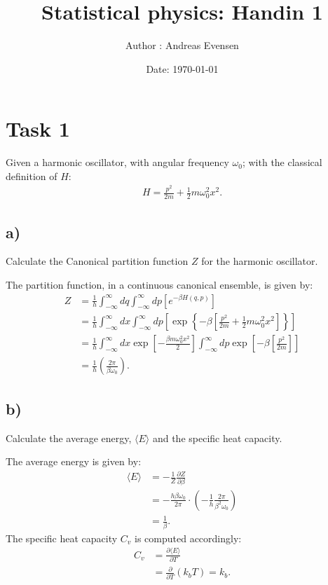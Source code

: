 \documentclass[a4paper]{article}
\title{Statistical physics: Handin 1}
\author{Author : Andreas Evensen}
\date{Date: \today}
\newcommand{\w}{\omega}
\newcommand{\average}[1]{\langle #1 \rangle}
\begin{document}
\maketitle

\section*{Task 1}
Given a harmonic oscillator, with angular frequency $\w_0$; with the classical definition of $H$:
\begin{align*}
    H = \frac{p^2}{2m} + \frac{1}{2}m\w_0^2x^2.
\end{align*}

\subsection*{a)}
Calculate the Canonical partition function $Z$ for the harmonic oscillator.

\vspace*{0.5cm}\noindent
The partition function, in a continuous canonical ensemble, is given by:
\begin{align*}
    Z &= \frac{1}{h}\int_{-\infty}^\infty dq \int_{-\infty}^{\infty} dp\left[ e^{-\beta H(q,p)}\right]\\
    &= \frac{1}{h}\int_{-\infty}^{\infty} dx \int_{-\infty}^\infty dp\left[ \exp\left\{-\beta\left[\frac{p^2}{2m} + \frac{1}{2}m\w_0^2x^2\right]\right\}\right]\\
    &= \frac{1}{h}\int_{-\infty}^{\infty} dx \exp\left[-\frac{\beta m\w_0^2x^2}{2}\right]\int_{-\infty}^{\infty} dp\exp\left[-\beta\left[\frac{p^2}{2m}\right]\right]\\
    &= \frac{1}{h}\left(\frac{2\pi}{\beta\w_0}\right).
\end{align*}

\subsection*{b)}
Calculate the average energy, $\langle E \rangle$ and the specific heat capacity.

\vspace*{0.5cm}\noindent
The average energy is given by:
\begin{align*}
    \average{E} &= -\frac{1}{Z}\frac{\partial Z}{\partial \beta}\\
    &= -\frac{h\beta\w_0}{2\pi}\cdot\left(-\frac{1}{h}\frac{2\pi}{\beta^2\w_0}\right)\\
    &= \frac{1}{\beta}.
\end{align*}The specific heat capacity $C_v$ is computed accordingly:
\begin{align*}
    C_v &= \frac{\partial \average{E}}{\partial T}\\
    &= \frac{\partial}{\partial T} \left(k_bT\right) = k_b.
\end{align*}
\end{document}
